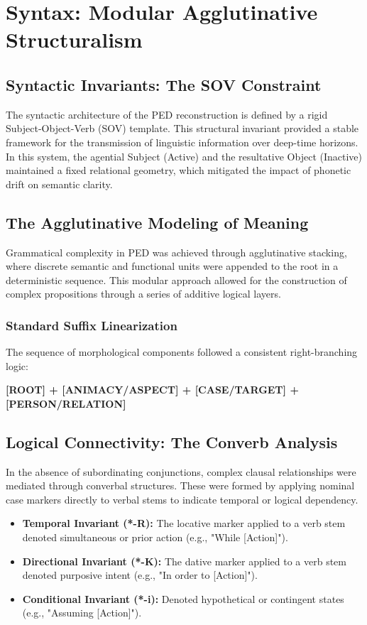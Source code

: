 \documentclass[11pt,oneside,openany]{book}
\begin{document}
\chapter{Syntax: Modular Agglutinative Structuralism}

\section{Syntactic Invariants: The SOV Constraint}
The syntactic architecture of the PED reconstruction is defined by a rigid Subject-Object-Verb (SOV) template. This structural invariant provided a stable framework for the transmission of linguistic information over deep-time horizons. In this system, the agential Subject (Active) and the resultative Object (Inactive) maintained a fixed relational geometry, which mitigated the impact of phonetic drift on semantic clarity.

\section{The Agglutinative Modeling of Meaning}
Grammatical complexity in PED was achieved through agglutinative stacking, where discrete semantic and functional units were appended to the root in a deterministic sequence. This modular approach allowed for the construction of complex propositions through a series of additive logical layers.

\subsection{Standard Suffix Linearization}
The sequence of morphological components followed a consistent right-branching logic:
\begin{center}
\textbf{[ROOT] + [ANIMACY/ASPECT] + [CASE/TARGET] + [PERSON/RELATION]}
\end{center}

\section{Logical Connectivity: The Converb Analysis}
In the absence of subordinating conjunctions, complex clausal relationships were mediated through converbal structures. These were formed by applying nominal case markers directly to verbal stems to indicate temporal or logical dependency.
\begin{itemize}
    \item \textbf{Temporal Invariant (*-R):} The locative marker applied to a verb stem denoted simultaneous or prior action (e.g., "While [Action]").
    \item \textbf{Directional Invariant (*-K):} The dative marker applied to a verb stem denoted purposive intent (e.g., "In order to [Action]").
    \item \textbf{Conditional Invariant (*-i):} Denoted hypothetical or contingent states (e.g., "Assuming [Action]").
\end{itemize}
\end{document}
